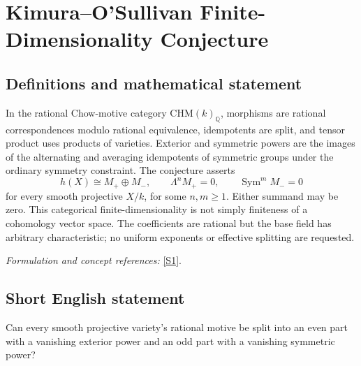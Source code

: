 \documentclass[11pt,a4paper]{article}
\newcommand{\Q}{\mathbb{Q}}
\newcommand{\sref}[2]{\hyperlink{source:#1:#2}{[S#2]}}
\newif\ifshowcatalogue
\newcommand{\cataloguescope}[1]{\ifshowcatalogue
 \paragraph{Exact scope in the supplied catalogue.}
 \begin{quote}\small #1\end{quote}\fi}
\numberwithin{equation}{section}
\begin{document}
\setcounter{section}{0}
\clearpage
\section*{\texorpdfstring{Kimura–O'Sullivan Finite-Dimensionality Conjecture}{Kimura–O'Sullivan Finite-Dimensionality Conjecture}}\label{statement}
\subsection{Definitions and mathematical statement}
In the rational Chow-motive category $\mathrm{CHM}(k)_{\Q}$, morphisms are rational correspondences modulo rational equivalence, idempotents are split, and tensor product uses products of varieties. Exterior and symmetric powers are the images of the alternating and averaging idempotents of symmetric groups under the ordinary symmetry constraint. The conjecture asserts
\[
 h(X)\cong M_+\oplus M_-,\qquad
 \Lambda^n M_+=0,\qquad\operatorname{Sym}^m M_-=0
\]
for every smooth projective $X/k$, for some $n,m\ge1$. Either summand may be zero. This categorical finite-dimensionality is not simply finiteness of a cohomology vector space. The coefficients are rational but the base field has arbitrary characteristic; no uniform exponents or effective splitting are requested.
\par\smallskip\textit{Formulation and concept references:} \sref{statement}{1}.
\cataloguescope{For every field k and every smooth projective variety X over k, the Chow motive h(X) with rational coefficients in the ordinary symmetric, pseudo-abelian category CHM(k)\_Q is Kimura–O'Sullivan finite-dimensional: there exist motives M+ and M\ensuremath{-} and positive integers n,m such that h(X) is isomorphic to M+ direct-sum M\ensuremath{-}, the exterior power \ensuremath{\Lambda}\textasciicircum{}n(M+) is zero, and the symmetric power Sym\textasciicircum{}m(M\ensuremath{-}) is zero. The summands may be zero. The field k is unrestricted; characteristic zero applies to the rational coefficient field, not to k. No effective construction, uniform n,m or classification is required.}
\subsection{Short English statement}
Can every smooth projective variety's rational motive be split into an even part with a vanishing exterior power and an odd part with a vanishing symmetric power?
\end{document}

